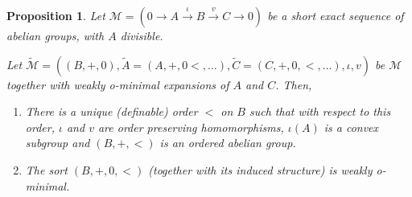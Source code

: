 \documentclass[11pt]{amsart}
\newtheorem{proposition}[theorem]{Proposition}
\theoremstyle{definition}
\newcommand{\CM}{{\mathcal M}}
\newcommand{\0}{\emptyset}
\begin{document}
    
    \begin{proposition}\label{P:wom shortexact}
    Let $\CM=(0\to A\xrightarrow[]{\iota} B\xrightarrow{v}C\to 0)$ be a short exact sequence of abelian groups, with $A$ divisible. 

        Let $\widetilde{\CM}=((B,+,0),\widetilde{A}=(A,+,0<,\dots),\widetilde{C}=(C,+,0,<,\dots),\iota,v)$ be $\CM$ together with weakly o-minimal expansions of $A$ and $C$. Then, 

        \begin{enumerate}
            \item There is a unique (definable) order $<$ on $B$ such that with respect to this order, $\iota$ and $v$ are order preserving homomorphisms, $\iota(A)$ is a convex subgroup and $(B,+,<)$ is an ordered abelian group.
            \item The sort $(B,+,0,<)$ (together with its induced structure) is weakly o-minimal.
        \end{enumerate}
    \end{proposition}
\end{document}
